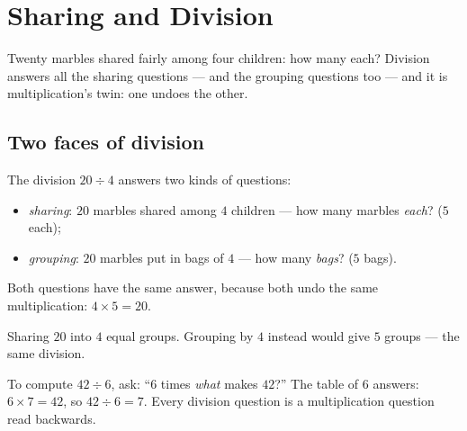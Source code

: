 \chapter{Sharing and Division}\label{ch:g3:division}

Twenty marbles shared fairly among four children: how many each?
Division answers all the sharing questions --- and the grouping
questions too --- and it is multiplication's twin: one undoes the
other.

\section{Two faces of division}

\begin{definition}[Division]\label{def:g3:division:def}
The division $20 \div 4$ answers two kinds of questions:
\begin{itemize}
  \item \emph{sharing}: $20$ marbles shared among $4$ children ---
        how many marbles \emph{each}? ($5$ each);
  \item \emph{grouping}: $20$ marbles put in bags of $4$ --- how many
        \emph{bags}? ($5$ bags).
\end{itemize}
Both questions have the same answer, because both undo the same
multiplication: $4 \times 5 = 20$.
\end{definition}

\begin{omfigure}

{\small Sharing $20$ into $4$ equal groups. Grouping by $4$ instead
would give $5$ groups --- the same division.}
\end{omfigure}

\begin{method}\label{met:g3:division:tables}
To compute $42 \div 6$, ask: ``$6$ times \emph{what} makes $42$?''
The table of $6$ answers: $6 \times 7 = 42$, so $42 \div 6 = 7$.
Every division question is a multiplication question read
backwards.
\end{method}

